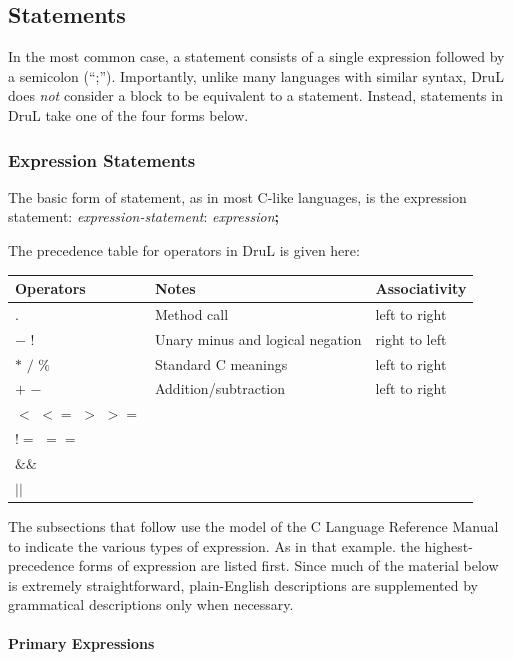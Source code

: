 \documentclass[11pt,twoside]{article}
\begin{document}
\subsection{Statements}

In the most common case, a statement consists of a single expression followed by a semicolon (``;'').  Importantly, unlike many languages with similar syntax, DruL does \emph{not} consider a block to be equivalent to a statement.  Instead, statements in DruL take one of the four forms below.



\subsubsection{Expression Statements}

The basic form of statement, as in most C-like languages, is the expression statement: \emph{expression-statement}: \emph{expression}\textbf{;}

The precedence table for operators in DruL is given here:

\begin{tabular}{ l |l| l}
\hline\hline
Operators & Notes & Associativity \\
\hline $ . $ & Method call & left to right \\
$-$  $!$ &Unary minus and logical negation & right to left \\
$*$ $/$ $\%$ & Standard C meanings & left to right \\
$+$ $-$ & Addition/subtraction & left to right \\
$<$ $<=$ $>$ $>=$ &  &  \\
$!=$ $==$ &  & \\
$\&\&$ &  & \\
$||$ &  & \\
\end{tabular}

The subsections that follow use the model of the C Language Reference Manual to indicate the various types of expression.  As in that example. the highest-precedence forms of expression are listed first.  Since much of the material below is extremely straightforward, plain-English descriptions are supplemented by grammatical descriptions only when necessary.

\paragraph{Primary Expressions}
\end{document}
